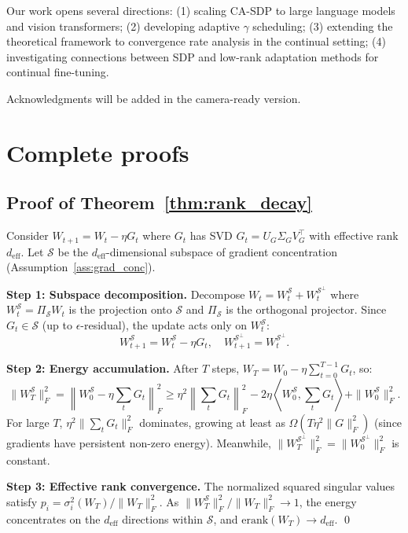 \documentclass{article}
\newcommand{\erank}{\mathrm{erank}}
\newcommand{\cS}{\mathcal{S}}
\begin{document}
Our work opens several directions: (1) scaling CA-SDP to large language models and vision transformers; (2) developing adaptive $\gamma$ scheduling; (3) extending the theoretical framework to convergence rate analysis in the continual setting; (4) investigating connections between SDP and low-rank adaptation methods for continual fine-tuning.

\begin{ack}
Acknowledgments will be added in the camera-ready version.
\end{ack}





\appendix

\section{Complete proofs}
\label{app:proofs}

\subsection{Proof of Theorem~\ref{thm:rank_decay}}

Consider $W_{t+1} = W_t - \eta G_t$ where $G_t$ has SVD $G_t = U_G \Sigma_G V_G^\top$ with effective rank $d_{\text{eff}}$. Let $\cS$ be the $d_{\text{eff}}$-dimensional subspace of gradient concentration (Assumption~\ref{ass:grad_conc}).

\textbf{Step 1: Subspace decomposition.} Decompose $W_t = W_t^{\cS} + W_t^{\cS^\perp}$ where $W_t^{\cS} = \Pi_{\cS} W_t$ is the projection onto $\cS$ and $\Pi_{\cS}$ is the orthogonal projector. Since $G_t \in \cS$ (up to $\epsilon$-residual), the update acts only on $W_t^{\cS}$:
\[
W_{t+1}^{\cS} = W_t^{\cS} - \eta G_t, \quad W_{t+1}^{\cS^\perp} = W_t^{\cS^\perp}.
\]

\textbf{Step 2: Energy accumulation.} After $T$ steps, $W_T = W_0 - \eta \sum_{t=0}^{T-1} G_t$, so:
\[
\|W_T^{\cS}\|_F^2 = \left\|W_0^{\cS} - \eta \sum_t G_t\right\|_F^2 \geq \eta^2 \left\|\sum_t G_t\right\|_F^2 - 2\eta \left\langle W_0^{\cS}, \sum_t G_t \right\rangle + \|W_0^{\cS}\|_F^2.
\]
For large $T$, $\eta^2 \|\sum_t G_t\|_F^2$ dominates, growing at least as $\Omega(T \eta^2 \|G\|_F^2)$ (since gradients have persistent non-zero energy). Meanwhile, $\|W_T^{\cS^\perp}\|_F^2 = \|W_0^{\cS^\perp}\|_F^2$ is constant.

\textbf{Step 3: Effective rank convergence.} The normalized squared singular values satisfy $p_i = \sigma_i^2(W_T) / \|W_T\|_F^2$. As $\|W_T^{\cS}\|_F^2 / \|W_T\|_F^2 \to 1$, the energy concentrates on the $d_{\text{eff}}$ directions within $\cS$, and $\erank(W_T) \to d_{\text{eff}}$. \qed
\end{document}
